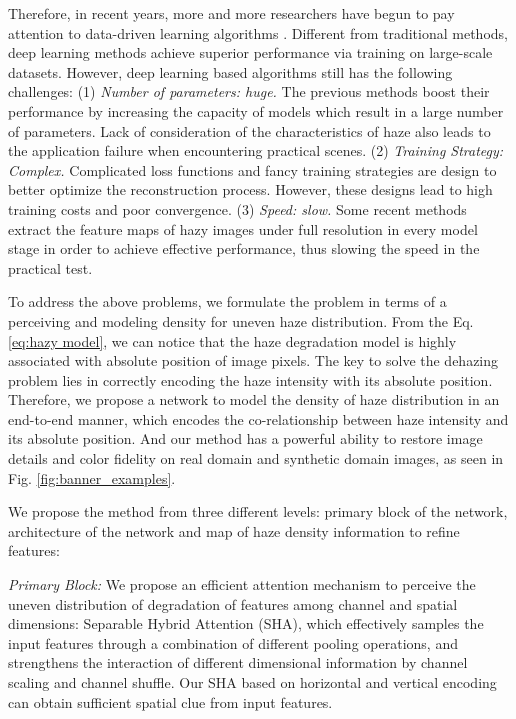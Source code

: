 \documentclass[final]{cvpr}
\begin{document}
Therefore, in recent years, more and more researchers have begun to pay attention to data-driven learning algorithms \cite{aod,msbdn,kddn,wu2021contrastive,ffa-net}. Different from traditional methods, deep learning methods achieve superior performance via training on large-scale datasets. However, deep learning based algorithms still has the following challenges: (1) \emph{Number of parameters: huge.} The previous methods \cite{liu2020trident,msbdn,yu2021two} boost their performance by increasing the capacity of models which result in a large number of parameters. 
Lack of  consideration of the characteristics of haze also leads to the application failure when encountering practical scenes. (2) \emph{Training Strategy: Complex.} Complicated loss functions \cite{kddn,wu2021contrastive,yu2021two,wu2020knowledge,liu2021synthetic} and fancy training strategies are design to better optimize the reconstruction process. However, these designs lead to high training costs and poor convergence. (3) \emph{Speed: slow.} Some recent methods \cite{ffa-net} extract the feature maps of hazy images under full resolution in every model stage in order to achieve effective performance, thus slowing the speed in the practical test.

 To address the above problems, we formulate the problem in terms of a perceiving and modeling density for uneven haze distribution. From the Eq.\ref{eq:hazy model}, we can notice that the haze degradation model is highly associated with absolute position of image pixels. The key to solve the dehazing problem lies in correctly encoding the haze intensity with its absolute position. Therefore, we propose a network to model the density of haze distribution in an end-to-end manner, which encodes the co-relationship between haze intensity and its absolute position. And our method has a powerful ability to restore image details and color fidelity on real domain and synthetic domain images, as seen in Fig. \ref{fig:banner_examples}.





We propose the method from three different levels: primary block of the network, architecture of the network and map of haze density information to refine features: 

 \textit{Primary Block:} We propose an efficient attention mechanism to perceive the uneven distribution of degradation of features among channel and spatial dimensions: Separable Hybrid Attention (SHA), which effectively samples the input features through a combination of different pooling operations, and strengthens the interaction of different dimensional information by channel scaling and channel shuffle. Our SHA based on horizontal and vertical encoding can obtain sufficient spatial clue from input features.
\end{document}
